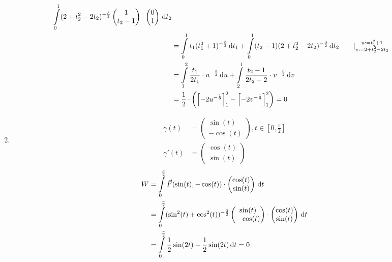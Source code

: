 \documentclass[fleqn,12pt]{scrartcl}
\newcommand{\id}{\, \mathrm{d}}
\newcommand{\intl}{\int\displaylimits}
\begin{document}
\begin{enumerate}
\begin{align*}
		\intl_0^1(2 + t_2^2 - 2t_2)^{-\frac32} \begin{pmatrix}1\\t_2 -1\end{pmatrix} \cdot \begin{pmatrix} 0\\1\end{pmatrix} \id t_2\\
			&= \intl_0^1 t_1(t_1^2 + 1)^{-\frac32} \id t_1 + \intl_0^1 (t_2 -1)(2 + t_2^2 - 2t_2)^{-\frac32} \id t_2 \qquad| \substack{u:=t_1^2 + 1 \\ v:=2 + t_2^2 - 2t_2}\\
			&=\intl_1^2 \frac{t_1}{2t_1} \cdot u^{-\frac32} \id u +  \intl_2^1 \frac{t_2 -1}{2t_2 -2} \cdot v^{-\frac32} \id v \\
			&= \frac12 \cdot \left ( \left [-2 u^{-\frac12} \right ]_1^2 - \left [ -2v^{-\frac12} \right ]_1^2 \right ) = 0
		\end{align*}
	\item

		\begin{align*}
		\gamma(t) &= \begin{pmatrix}\sin(t)\\-\cos(t)\end{pmatrix}, t\in\left[0, \frac\pi2\right]\\
		\gamma'(t) &= \begin{pmatrix}\cos(t)\\ \sin(t) \end{pmatrix}
		\end{align*}
		\begin{align*}
		W &= \intl_0^\frac\pi2\vec F(\sin(t), -\cos(t)) \cdot \begin{pmatrix}\cos(t)\\\sin(t)\end{pmatrix} \id t\\
			 &= \intl_0^\frac\pi2 (\sin^2(t) + \cos^2(t))^{-\frac32} \begin{pmatrix}\sin(t)\\-\cos(t)\end{pmatrix} \cdot \begin{pmatrix} \cos(t)\\\sin(t)\end{pmatrix}\id t\\
			 &= \intl_0^\frac\pi2 \frac12 \sin(2t) - \frac12 \sin(2t) \id t = 0
		\end{align*}
\end{enumerate}
\end{document}
